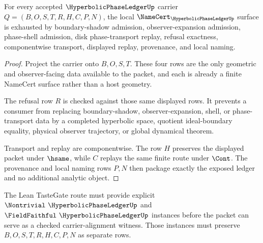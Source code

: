 \begin{theorem}
\label{thm:hyperbolic-phase-ledger-namecert-obligations}
For every accepted $\HyperbolicPhaseLedgerUp$ carrier $Q=(B,O,S,T,R,H,C,P,N)$, the local $\NameCert_{\HyperbolicPhaseLedgerUp}$ surface is exhausted by boundary-shadow admission, observer-expansion admission, phase-shell admission, disk phase-transport replay, refusal exactness, componentwise transport, displayed replay, provenance, and local naming.
\end{theorem}
\begin{proof}
Project the carrier onto $B,O,S,T$. These four rows are the only geometric and observer-facing data available to the packet, and each is already a finite NameCert surface rather than a host geometry.

The refusal row $R$ is checked against those same displayed rows. It prevents a consumer from replacing boundary-shadow, observer-expansion, shell, or phase-transport data by a completed hyperbolic space, quotient ideal-boundary equality, physical observer trajectory, or global dynamical theorem.

Transport and replay are componentwise. The row $H$ preserves the displayed packet under $\hsame$, while $C$ replays the same finite route under $\Cont$. The provenance and local naming rows $P,N$ then package exactly the exposed ledger and no additional analytic object.
\end{proof}



The Lean TasteGate route must provide explicit $\Nontrivial\ \HyperbolicPhaseLedgerUp$ and $\FieldFaithful\ \HyperbolicPhaseLedgerUp$ instances before the packet can serve as a checked carrier-alignment witness. Those instances must preserve $B,O,S,T,R,H,C,P,N$ as separate rows.

